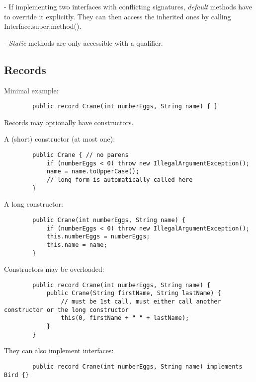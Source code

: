 \documentclass{scrartcl}
\begin{document}
    - If implementing two interfaces with conflicting signatures, \textit{default} methods have to override it explicitly. They  can then access the inherited ones by calling Interface.super.method().

    - \textit{Static} methods are only accessible with a qualifier.

\subsection{Records}

    Minimal example:

    \begin{lstlisting}
        public record Crane(int numberEggs, String name) { }
    \end{lstlisting}

    Records may optionally have constructors.

    A (short) constructor (at most one):

    \begin{lstlisting}
        public Crane { // no parens
            if (numberEggs < 0) throw new IllegalArgumentException();
            name = name.toUpperCase();
            // long form is automatically called here
        }
    \end{lstlisting}

    A long constructor:

    \begin{lstlisting}
        public Crane(int numberEggs, String name) {
            if (numberEggs < 0) throw new IllegalArgumentException();
            this.numberEggs = numberEggs;
            this.name = name;
        }
    \end{lstlisting}

    Constructors may be overloaded:

    \begin{lstlisting}
        public record Crane(int numberEggs, String name) {
            public Crane(String firstName, String lastName) {
                // must be 1st call, must either call another constructor or the long constructor
                this(0, firstName + " " + lastName);
            }
        }
    \end{lstlisting}

    They can also implement interfaces:

    \begin{lstlisting}
        public record Crane(int numberEggs, String name) implements Bird {}
    \end{lstlisting}
\end{document}
